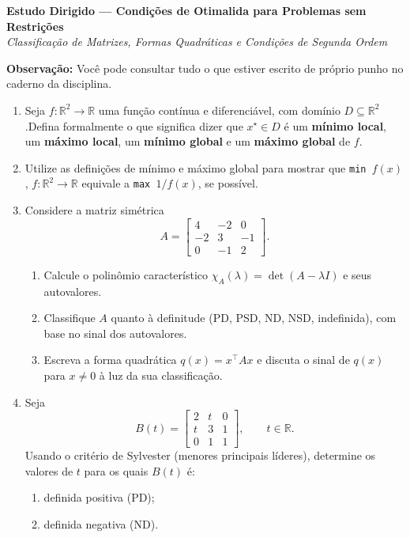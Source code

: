\documentclass[10pt,a4paper]{extarticle}
\begin{document}
\begin{center}
{\Large \textbf{Estudo Dirigido — Condições de Otimalida para Problemas sem Restrições}}\\[4pt]
\textit{Classificação de Matrizes, Formas Quadráticas e Condições de Segunda Ordem}\\[6pt]
\end{center}

\noindent\textbf{Observação:} Você pode consultar tudo o que estiver escrito de próprio punho no caderno da disciplina.

\bigskip

\begin{enumerate}[label=\textbf{Q\arabic*.}]

\item Seja \( f:\mathbb{R}^2 \to \mathbb{R} \) uma função contínua e diferenciável, com domínio \( D \subseteq \mathbb{R}^2 \).Defina formalmente o que significa dizer que \( x^\star \in D \) é um \textbf{mínimo local}, um \textbf{máximo local}, um \textbf{mínimo global} e um \textbf{máximo global} de \( f \).

\item Utilize as definições de mínimo e máximo global para mostrar que \texttt{min }\(f(x) \), \( f:\mathbb{R}^2 \to \mathbb{R} \) equivale a \texttt{max }\(1/f(x)\), se possível.

\item Considere a matriz simétrica
\[
A = \begin{bmatrix}
4 & -2 & 0\\
-2 & 3 & -1\\
0 & -1 & 2
\end{bmatrix}.
\]
\begin{enumerate}[label=(\alph*)]
\item Calcule o polinômio característico $\chi_A(\lambda)=\det(A-\lambda I)$ e seus autovalores.
\item Classifique $A$ quanto à definitude (PD, PSD, ND, NSD, indefinida), com base no sinal dos autovalores.
\item Escreva a forma quadrática $q(x)=x^\top A x$ e discuta o sinal de $q(x)$ para $x\neq 0$ à luz da sua classificação.
\end{enumerate}

\bigskip

\item Seja
\[
B(t)=\begin{bmatrix}
2 & t & 0\\
t & 3 & 1\\
0 & 1 & 1
\end{bmatrix},\qquad t\in\mathbb{R}.
\]
Usando o critério de Sylvester (menores principais líderes), determine os valores de $t$ para os quais $B(t)$ é:
\begin{enumerate}[label=(\alph*)]
\item definida positiva (PD);
\item definida negativa (ND).
\end{enumerate}


\end{enumerate}
\end{document}
